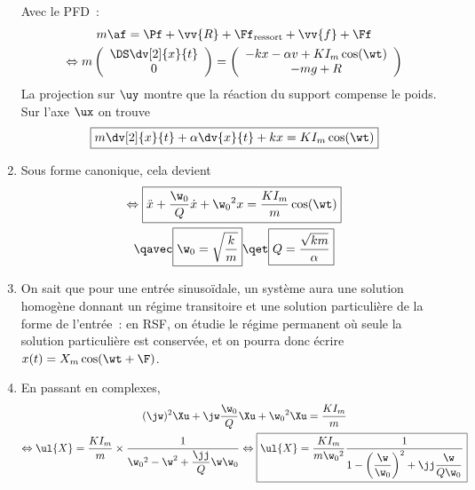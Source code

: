 \documentclass[a4paper, 12pt, final, garamond]{book}
\begin{document}
\begin{enumerate}
        Avec le PFD~:
        \begin{gather*}
            m\af = \Pf + \vv{R} + \Ff_{\rm ressort} + \vv{f} +\Ff\\
            \Leftrightarrow m\left(
                \begin{array}{c}
                    \DS\dv[2]{x}{t}\\
                    0
                \end{array}
            \right)
            =
            \left(
                \begin{array}{c}
                    -kx -\alpha v + KI_m\cos(\wt)\\
                    -mg + R
                \end{array}
            \right)
        \end{gather*}
        La projection sur $\uy$ montre que la réaction du support compense le poids.
        Sur l'axe $\ux$ on trouve
        \begin{gather*}
            \boxed{m \dv[2]{x}{t} + \alpha \dv{x}{t} + kx = KI_m\cos(\wt)}
        \end{gather*}
    \item Sous forme canonique, cela devient
        \begin{gather*}
            \Leftrightarrow
            \boxed{\ddot{x} + \frac{\w_0}{Q}\dot{x} + \w_0{}^2x =
                \frac{KI_m}{m}\cos(\wt)}\\
            \qavec
            \boxed{\w_0 = \sqrt{\frac{k}{m}}}
            \qet
            \boxed{Q = \frac{\sqrt{km}}{\alpha}}
        \end{gather*}
    \item On sait que pour une entrée sinusoïdale, un système aura une solution
        homogène donnant un régime transitoire et une solution particulière de
        la forme de l'entrée~: en RSF, on étudie le régime permanent où seule la
        solution particulière est conservée, et on pourra donc écrire $x(t) =
        X_m\cos(\wt+\F)$.
    \item 
        En passant en complexes,
        \begin{gather*}
            (\jw)^2\Xu + \jw\frac{\w_0}{Q}\Xu + \w_0{}^2\Xu = \frac{KI_m}{m}\\
            \Leftrightarrow
            \ul{X} =
                \frac{KI_m}{m}\times
                \frac{1}{\w_0{}^2 - \w^2 + \dfrac{\jj}{Q}\w\w_0}
            \Leftrightarrow
            \boxed{
            \ul{X} = \frac{KI_m}{m\w_0{}^2}\frac{1}{1 -
                                        \left( \dfrac{\w}{\w_0} \right)^2 +
                                        \jj\dfrac{\w}{Q\w_0}}
                    }
        \end{gather*}


\end{enumerate}
\end{document}
